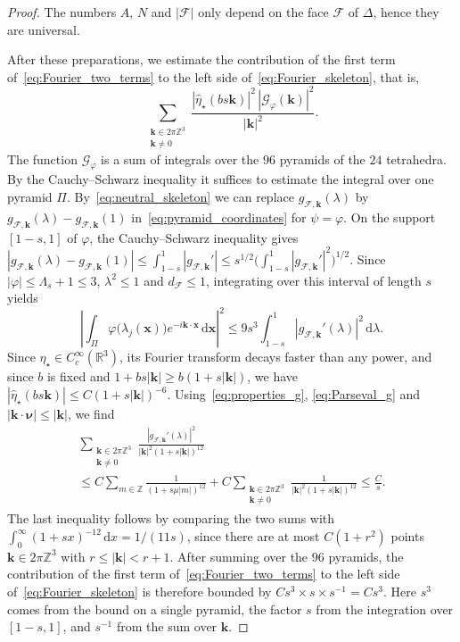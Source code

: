 \documentclass[final,reqno]{amsart}
\theoremstyle{remark}
\renewcommand{\le}{\leqslant}
\renewcommand{\ge}{\geqslant}
\let\phi=\varphi
\newcommand{\wh}[1]{\widehat{#1}}
\newcommand{\RR}{\mathbb{R}}
\newcommand{\ZZ}{\mathbb{Z}}
\newcommand{\tetra}{\mathbb{\Delta}}
\newcommand{\dd}{\mathrm{d}}
\newcommand{\GC}{\mathcal{G}}
\begin{document}
\begin{proof}
The numbers $A$, $N$ and $|\mathcal{F}|$ only depend on the face $\mathcal{F}$ of $\tetra$, hence they are universal.

After these preparations, we estimate the contribution of the first term of~\cref{eq:Fourier_two_terms} to the left side of~\cref{eq:Fourier_skeleton}, that is,
$$
\sum_{\substack{\mathbf{k}\in 2\pi\ZZ^3\\ \mathbf{k}\neq0}}\frac{|\wh{\eta}_\star(bs\mathbf{k})|^2\,|\GC_\phi(\mathbf{k})|^2}{|\mathbf{k}|^2}.
$$
The function $\GC_\phi$ is a sum of integrals over the $96$ pyramids of the $24$ tetrahedra. By the Cauchy--Schwarz inequality it suffices to estimate the integral over one pyramid $\Pi$. By~\cref{eq:neutral_skeleton} we can replace $g_{\mathcal{F},\mathbf{k}}(\lambda)$ by $g_{\mathcal{F},\mathbf{k}}(\lambda)-g_{\mathcal{F},\mathbf{k}}(1)$ in~\cref{eq:pyramid_coordinates} for $\psi=\phi$. On the support $[1-s,1]$ of $\phi$, the Cauchy--Schwarz inequality gives $|g_{\mathcal{F},\mathbf{k}}(\lambda)-g_{\mathcal{F},\mathbf{k}}(1)|\le\int_{1-s}^1|g_{\mathcal{F},\mathbf{k}}'|\le s^{1/2}\big(\int_{1-s}^1|g_{\mathcal{F},\mathbf{k}}'|^2\big)^{1/2}$. Since $|\phi|\le\Lambda_s+1\le3$, $\lambda^2\le1$ and $d_{\mathcal{F}}\le1$, integrating over this interval of length $s$ yields
\begin{equation*}
\left|\int_\Pi\phi\big(\lambda_j(\mathbf{x})\big)e^{-i\mathbf{k}\cdot \mathbf{x}}\,\dd \mathbf{x}\right|^2\le 9s^3\int_{1-s}^1|g_{\mathcal{F},\mathbf{k}}'(\lambda)|^2\,\dd\lambda.
\end{equation*}
Since $\eta_\star\in C^\infty_c(\RR^3)$, its Fourier transform decays faster than any power, and since $b$ is fixed and $1+bs|\mathbf{k}|\ge b(1+s|\mathbf{k}|)$, we have $|\wh{\eta}_\star(bs\mathbf{k})|\le C(1+s|\mathbf{k}|)^{-6}$. Using~\cref{eq:properties_g}, \cref{eq:Parseval_g} and $|\mathbf{k}\cdot \bm{\nu}|\le|\mathbf{k}|$, we find
\begin{multline*}
\sum_{\substack{\mathbf{k}\in 2\pi\ZZ^3\\ \mathbf{k}\neq0}}\frac{|g_{\mathcal{F},\mathbf{k}}'(\lambda)|^2}{|\mathbf{k}|^2(1+s|\mathbf{k}|)^{12}}\\
\le C\sum_{m\in\ZZ}\frac{1}{(1+s\mu|m|)^{12}}+C\sum_{\substack{\mathbf{k}\in 2\pi\ZZ^3\\ \mathbf{k}\neq0}}\frac{1}{|\mathbf{k}|^2(1+s|\mathbf{k}|)^{12}}\le \frac{C}{s}.
\end{multline*}
The last inequality follows by comparing the two sums with $\int_0^\infty(1+sx)^{-12}\,\dd x=1/(11s)$, since there are at most $C(1+r^2)$ points $\mathbf{k}\in2\pi\ZZ^3$ with $r\le|\mathbf{k}|<r+1$. After summing over the $96$ pyramids, the contribution of the first term of~\cref{eq:Fourier_two_terms} to the left side of~\cref{eq:Fourier_skeleton} is therefore bounded by $Cs^3\times s\times s^{-1}=Cs^3$. Here $s^3$ comes from the bound on a single pyramid, the factor $s$ from the integration over $[1-s,1]$, and $s^{-1}$ from the sum over $\mathbf{k}$.


\end{proof}
\end{document}
